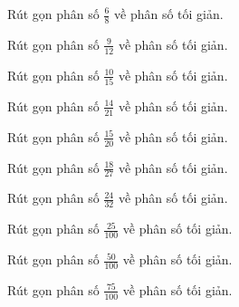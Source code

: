 \begin{ex}
Rút gọn phân số $\frac{6}{8}$ về phân số tối giản.
\end{ex}

\begin{ex}
Rút gọn phân số $\frac{9}{12}$ về phân số tối giản.
\end{ex}

\begin{ex}
Rút gọn phân số $\frac{10}{15}$ về phân số tối giản.
\end{ex}

\begin{ex}
Rút gọn phân số $\frac{14}{21}$ về phân số tối giản.
\end{ex}

\begin{ex}
Rút gọn phân số $\frac{15}{20}$ về phân số tối giản.
\end{ex}

\begin{ex}
Rút gọn phân số $\frac{18}{27}$ về phân số tối giản.
\end{ex}

\begin{ex}
Rút gọn phân số $\frac{24}{32}$ về phân số tối giản.
\end{ex}

\begin{ex}
Rút gọn phân số $\frac{25}{100}$ về phân số tối giản.
\end{ex}

\begin{ex}
Rút gọn phân số $\frac{50}{100}$ về phân số tối giản.
\end{ex}

\begin{ex}
Rút gọn phân số $\frac{75}{100}$ về phân số tối giản.
\end{ex}

